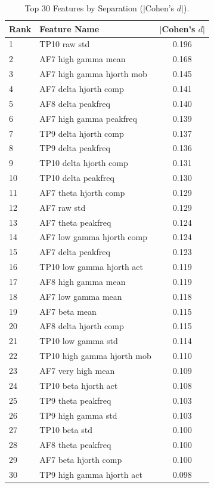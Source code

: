 \begin{table}[ht]
\centering
\begin{tabular}{llc}
\hline
Rank & Feature Name & $|$Cohen's $d|$ \\
\hline
1 & TP10 raw std & 0.196 \\
2 & AF7 high gamma mean & 0.168 \\
3 & AF7 high gamma hjorth mob & 0.145 \\
4 & AF7 delta hjorth comp & 0.141 \\
5 & AF8 delta peakfreq & 0.140 \\
6 & AF7 high gamma peakfreq & 0.139 \\
7 & TP9 delta hjorth comp & 0.137 \\
8 & TP9 delta peakfreq & 0.136 \\
9 & TP10 delta hjorth comp & 0.131 \\
10 & TP10 delta peakfreq & 0.130 \\
11 & AF7 theta hjorth comp & 0.129 \\
12 & AF7 raw std & 0.129 \\
13 & AF7 theta peakfreq & 0.124 \\
14 & AF7 low gamma hjorth comp & 0.124 \\
15 & AF7 delta peakfreq & 0.123 \\
16 & TP10 low gamma hjorth act & 0.119 \\
17 & AF8 high gamma mean & 0.119 \\
18 & AF7 low gamma mean & 0.118 \\
19 & AF7 beta mean & 0.115 \\
20 & AF8 delta hjorth comp & 0.115 \\
21 & TP10 low gamma std & 0.114 \\
22 & TP10 high gamma hjorth mob & 0.110 \\
23 & AF7 very high mean & 0.109 \\
24 & TP10 beta hjorth act & 0.108 \\
25 & TP9 theta peakfreq & 0.103 \\
26 & TP9 high gamma std & 0.103 \\
27 & TP10 beta std & 0.100 \\
28 & AF8 theta peakfreq & 0.100 \\
29 & AF7 beta hjorth comp & 0.100 \\
30 & TP9 high gamma hjorth act & 0.098 \\
\hline
\end{tabular}
\caption{Top 30 Features by Separation ($|$Cohen's $d|$).}
\label{tab:cohend_top_features}
\end{table}